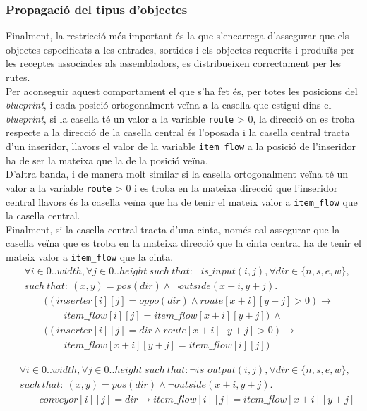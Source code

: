 \subsubsection{Propagació del tipus d'objectes}
Finalment, la restricció més important és la que s'encarrega d'assegurar que els objectes especificats a les entrades, sortides i els objectes requerits i produïts per les receptes associades als assembladors, es distribueixen correctament per les rutes.\\
Per aconseguir aquest comportament el que s'ha fet és, per totes les posicions del \textit{blueprint}, i cada posició ortogonalment veïna a la casella que estigui dins el \textit{blueprint}, si la casella té un valor a la variable \lstinline{route} > 0, la direcció on es troba respecte a la direcció de la casella central és l'oposada i la casella central tracta d'un inseridor, llavors el valor de la variable \lstinline{item_flow} a la posició de l'inseridor ha de ser la mateixa que la de la posició veïna.\\
D'altra banda, i de manera molt similar si la casella ortogonalment veïna té un valor a la variable \lstinline{route} > 0 i es troba en la mateixa direcció que l'inseridor central llavors és la casella veïna que ha de tenir el mateix valor a \lstinline{item_flow} que la casella central.\\
Finalment, si la casella central tracta d'una cinta, només cal assegurar que la casella veïna que es troba en la mateixa direcció que la cinta central ha de tenir el mateix valor a \lstinline{item_flow} que la cinta.\\
\begin{align*}
    &\forall i \in 0..width, \forall j \in 0..height \ such \ that: \neg is\_input(i,j), \forall dir \in \{n, s, e, w\},\\
    &such \ that: \ (x,y)=pos(dir) \land \neg outside(x+i, y+j).\\
    &\qquad ((inserter[i][j] = oppo(dir) \land  route[x+i][y+j] > 0) \rightarrow\\
    &\qquad \qquad item\_flow[i][j] = item\_flow[x+i][y+j]) \ \land \\
    &\qquad ((inserter[i][j] = dir \land route[x+i][y+j] > 0) \rightarrow\\
    &\qquad \qquad item\_flow[x+i][y+j] = item\_flow[i][j])
\end{align*}

\begin{align*}
    &\forall i \in 0..width, \forall j \in 0..height \ such \ that: \neg is\_output(i,j), \forall dir \in \{n, s, e, w\},\\
    &such \ that: \ (x,y)=pos(dir) \land \neg outside(x+i, y+j).\\
    &\qquad conveyor[i][j] = dir \rightarrow item\_flow[i][j] = item\_flow[x+i][y+j]
\end{align*}

